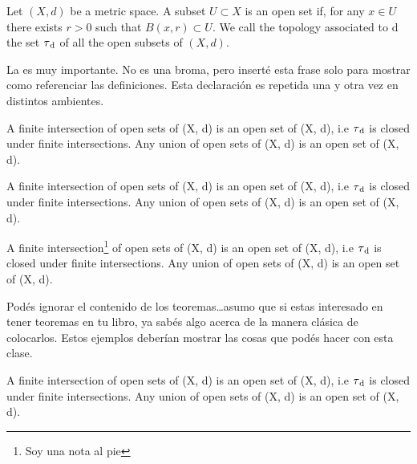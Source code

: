\begin{definition}
    Let $(X, d)$ be a metric space. A subset $U \subset X$ is an open set if, for any $x \in U$ there exists $r > 0$ such that $B(x, r) \subset U$. We call the topology associated to d the set $\tau\textsubscript{d}$ of all the open subsets of $(X, d).$
\end{definition}

La  es muy importante. No es una broma, pero inserté esta frase solo para mostrar como referenciar las definiciones. Esta declaración es repetida una y otra vez en distintos ambientes.

\begin{theorem}
    A finite intersection of open sets of (X, d) is an open set of (X, d), i.e $\tau\textsubscript{d}$ is closed under finite intersections. Any union of open sets of (X, d) is an open set of (X, d).
\end{theorem}

\begin{proposition}
    A finite intersection of open sets of (X, d) is an open set of (X, d), i.e $\tau\textsubscript{d}$ is closed under finite intersections. Any union of open sets of (X, d) is an open set of (X, d).
\end{proposition}

\begin{lemma}
    A finite intersection\footnote{Soy una nota al pie} of open sets of (X, d) is an open set of (X, d), i.e $\tau\textsubscript{d}$ is closed under finite intersections. Any union of open sets of (X, d) is an open set of (X, d).
\end{lemma}

Podés ignorar el contenido de los teoremas\ldots asumo que si estas interesado en tener teoremas en tu libro, ya sabés algo acerca de la manera clásica de colocarlos. Estos ejemplos deberían mostrar las cosas que podés hacer con esta clase.

\begin{corollary}
    A finite intersection of open sets of (X, d) is an open set of (X, d), i.e $\tau\textsubscript{d}$ is closed under finite intersections. Any union of open sets of (X, d) is an open set of (X, d).
\end{corollary}

